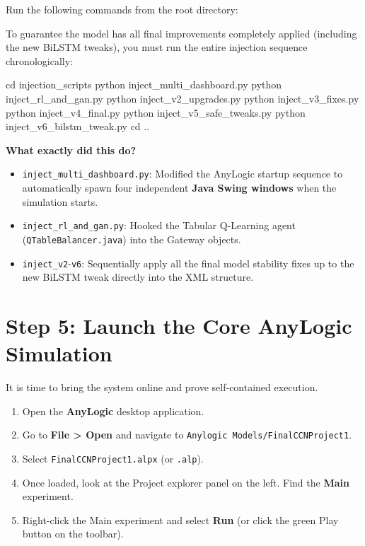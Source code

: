 \documentclass[12pt,a4paper]{article}
\begin{document}
Run the following commands from the root directory:

To guarantee the model has all final improvements completely applied (including the new BiLSTM tweaks), you must run the entire injection sequence chronologically:

\begin{terminalBox}
cd injection\_scripts
python inject\_multi\_dashboard.py
python inject\_rl\_and\_gan.py
python inject\_v2\_upgrades.py
python inject\_v3\_fixes.py
python inject\_v4\_final.py
python inject\_v5\_safe\_tweaks.py
python inject\_v6\_bilstm\_tweak.py
cd ..
\end{terminalBox}

\textbf{What exactly did this do?}
\begin{itemize}
    \item \texttt{inject\_multi\_dashboard.py}: Modified the AnyLogic startup sequence to automatically spawn four independent \textbf{Java Swing windows} when the simulation starts.
    \item \texttt{inject\_rl\_and\_gan.py}: Hooked the Tabular Q-Learning agent (\texttt{QTableBalancer.java}) into the Gateway objects.
    \item \texttt{inject\_v2}-\texttt{v6}: Sequentially apply all the final model stability fixes up to the new BiLSTM tweak directly into the XML structure.
\end{itemize}

\section{Step 5: Launch the Core AnyLogic Simulation}

It is time to bring the system online and prove self-contained execution. 

\begin{enumerate}[leftmargin=*]
    \item Open the \textbf{AnyLogic} desktop application.
    \item Go to \textbf{File > Open} and navigate to \texttt{Anylogic Models/FinalCCNProject1}.
    \item Select \texttt{FinalCCNProject1.alpx} (or \texttt{.alp}).
    \item Once loaded, look at the Project explorer panel on the left. Find the \textbf{Main} experiment.
    \item Right-click the Main experiment and select \textbf{Run} (or click the green Play button on the toolbar).
\end{enumerate}
\end{document}

